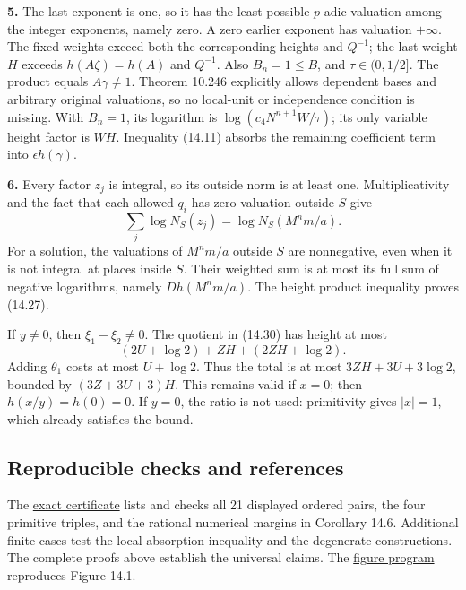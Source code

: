 \documentclass[
  11pt,
  a4paper,
]{article}
\begin{document}
\textbf{5.} The last exponent is one, so it has the least possible
\(p\)-adic valuation among the integer exponents, namely zero. A zero
earlier exponent has valuation \(+\infty\). The fixed weights exceed
both the corresponding heights and \(Q^{-1}\); the last weight \(H\)
exceeds \(h(A\zeta)=h(A)\) and \(Q^{-1}\). Also \(B_n=1\le B\), and
\(\tau\in(0,1/2]\). The product equals \(A\gamma\ne1\). Theorem 10.246
explicitly allows dependent bases and arbitrary original valuations, so
no local-unit or independence condition is missing. With \(B_n=1\), its
logarithm is \(\log(c_4N^{n+1}W/\tau)\); its only variable height factor
is \(WH\). Inequality (14.11) absorbs the remaining coefficient term
into \(\epsilon h(\gamma)\).

\textbf{6.} Every factor \(z_j\) is integral, so its outside norm is at
least one. Multiplicativity and the fact that each allowed \(q_i\) has
zero valuation outside \(S\) give \[
\sum_j\log N_S(z_j)=\log N_S(M^nm/a).
\] For a solution, the valuations of \(M^nm/a\) outside \(S\) are
nonnegative, even when it is not integral at places inside \(S\). Their
weighted sum is at most its full sum of negative logarithms, namely
\(D h(M^nm/a)\). The height product inequality proves (14.27).

If \(y\ne0\), then \(\xi_1-\xi_2\ne0\). The quotient in (14.30) has
height at most \[
(2U+\log2)+ZH+(2ZH+\log2).
\] Adding \(\theta_1\) costs at most \(U+\log2\). Thus the total is at
most \(3ZH+3U+3\log2\), bounded by \((3Z+3U+3)H\). This remains valid if
\(x=0\); then \(h(x/y)=h(0)=0\). If \(y=0\), the ratio is not used:
primitivity gives \(|x|=1\), which already satisfies the bound.

\subsection{Reproducible checks and
references}\label{reproducible-checks-and-references}

The \href{https://kokunoyumeto.github.io/open-math-courses-public/courses/TR-BAKER/verification/sunit-check.py}{exact certificate} lists and
checks all 21 displayed ordered pairs, the four primitive triples, and
the rational numerical margins in Corollary 14.6. Additional finite
cases test the local absorption inequality and the degenerate
constructions. The complete proofs above establish the universal claims.
The \href{https://kokunoyumeto.github.io/open-math-courses-public/courses/TR-BAKER/figure_sources/sunit-place-geometry.py}{figure program}
reproduces Figure 14.1.
\end{document}
